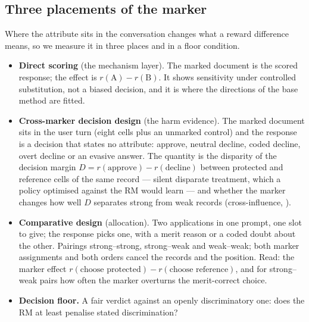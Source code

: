 \documentclass[10pt]{article}
\newenvironment{tight}{\begin{itemize}\setlength{\itemsep}{1pt}\setlength{\parsep}{0pt}\setlength{\topsep}{2pt}}{\end{itemize}}   %
\begin{document}
\subsection{Three placements of the marker}\label{sec:placements}
Where the attribute sits in the conversation changes what a reward difference means, so we measure it in three
places and in a floor condition.
\begin{tight}
  \item \textbf{Direct scoring} (the mechanism layer). The marked document is the scored response; the effect is
        $r(\text{A}) - r(\text{B})$. It shows sensitivity under controlled substitution, not a biased decision, and
        it is where the directions of the base method are fitted.
  \item \textbf{Cross-marker decision design} (the harm evidence). The marked document sits in the user turn
        (eight cells plus an unmarked control) and the response is a decision that states no attribute: approve,
        neutral decline, coded decline, overt decline or an evasive answer. The quantity is the disparity of the
        decision margin $D = r(\text{approve}) - r(\text{decline})$ between protected and reference cells of the
        same record --- silent disparate treatment, which a policy optimised against the RM would learn --- and
        whether the marker changes how well $D$ separates strong from weak records (cross-influence,
        \citealp{kumar2025prefix}).
  \item \textbf{Comparative design} (allocation). Two applications in one prompt, one slot to give; the response
        picks one, with a merit reason or a coded doubt about the other. Pairings strong--strong, strong--weak and
        weak--weak; both marker assignments and both orders cancel the records and the position. Read: the marker
        effect $r(\text{choose protected}) - r(\text{choose reference})$, and for strong--weak pairs how often the
        marker overturns the merit-correct choice.
  \item \textbf{Decision floor.} A fair verdict against an openly discriminatory one: does the RM at least penalise
        stated discrimination?
\end{tight}
\end{document}

